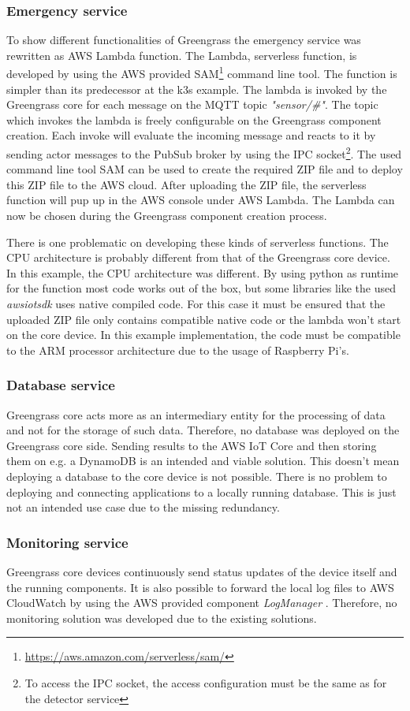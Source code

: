 \subsubsection*{Emergency service}
To show different functionalities of Greengrass the emergency service was rewritten as \gls{AWS} Lambda function. The Lambda, serverless function, is developed by using the AWS provided \gls{SAM}\footnote{\url{https://aws.amazon.com/serverless/sam/}} command line tool. The function is simpler than its predecessor at the k3s example. The lambda is invoked by the Greengrass core for each message on the MQTT topic \textit{"sensor/\#"}. The topic which invokes the lambda is freely configurable on the Greengrass component creation. Each invoke will evaluate the incoming message and reacts to it by sending actor messages to the PubSub broker by using the \gls{IPC} socket\footnote{To access the IPC socket, the access configuration must be the same as for the detector service}. The used command line tool \gls{SAM} can be used to create the required ZIP file and to deploy this ZIP file to the \gls{AWS} cloud. After uploading the ZIP file, the serverless function will pup up in the \gls{AWS} console under \gls{AWS} Lambda. The Lambda can now be chosen during the Greengrass component creation process.

\bigskip
There is one problematic on developing these kinds of serverless functions. The CPU architecture is probably different from that of the Greengrass core device. In this example, the CPU architecture was different. By using python as runtime for the function most code works out of the box, but some libraries like the used \textit{awsiotsdk} uses native compiled code. For this case it must be ensured that the uploaded ZIP file only contains compatible native code or the lambda won't start on the core device. In this example implementation, the code must be compatible to the ARM processor architecture due to the usage of Raspberry Pi's.


\subsubsection*{Database service}
Greengrass core acts more as an intermediary entity for the processing of data and not for the storage of such data. Therefore, no database was deployed on the Greengrass core side. Sending results to the \gls{AWS} IoT Core and then storing them on e.g. a DynamoDB is an intended and viable solution. This doesn't mean deploying a database to the core device is not possible. There is no problem to deploying and connecting applications to a locally running database. This is just not an intended use case due to the missing redundancy.


\subsubsection*{Monitoring service}
Greengrass core devices continuously send status updates of the device itself and the running components. It is also possible to forward the local log files to \gls{AWS} CloudWatch by using the AWS provided component \textit{LogManager} \cite{AmazonWebServicesLogManager}. Therefore, no monitoring solution was developed due to the existing solutions.
        